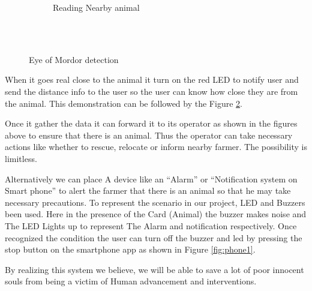 \documentclass[12pt]{article}
\begin{document}
\begin{figure}[!h]
\begin{subfigure}{.5\textwidth}
  \caption{Reading Nearby animal}
  \label{fig:sub3}
\end{subfigure} \\ \\
\caption{Eye of Mordor detection}
\label{fig:eye23}
\end{figure}

When it goes real close to the animal it turn on the red LED to notify user and send the distance info to the user so the user can know how close they are from the animal. This demonstration can be followed by the Figure \ref{fig:eye23}.

Once it gather the data it can forward it to its operator as shown in the figures above to ensure that there is an animal. Thus the operator can take necessary actions like whether to rescue, relocate or inform nearby farmer. The possibility is limitless.

Alternatively we can place A device like an “Alarm” or “Notification system on Smart phone” to alert the farmer that there is an animal so that he may take necessary precautions. To represent the scenario in our project, LED and Buzzers been used. Here in the presence of the Card (Animal) the buzzer makes noise and The LED Lights up to represent The Alarm and notification respectively. Once recognized the condition the user can turn off the buzzer and led by pressing the stop button on the smartphone app as shown in Figure \ref{fig:phone1}.

By realizing this system we believe, we will be able to save a lot of poor innocent souls from being a victim of Human advancement and interventions.
\end{document}
